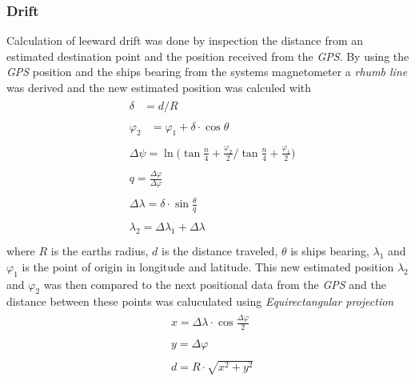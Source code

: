 \subsubsection{Drift}
Calculation of leeward drift was done by inspection the distance from an estimated destination point and the position received from the \textit{GPS}. By using the \textit{GPS} position and the ships bearing from the systems magnetometer a \textit{rhumb line}\cite{rhumb-line} was derived and the new estimated position was calculed with
\begin{align*}
  &\begin{aligned}
  \delta &= d/R 
  \end{aligned}\\
 &\begin{aligned}
  \varphi_2 &= \varphi_1 + \delta \cdot \cos{\theta}
  \end{aligned}\\
 &\begin{aligned}
  \Delta\psi = \ln { \bigg( \tan{\frac{n}{4} + \frac{\varphi_2}{2}} \bigg/ \tan{\frac{n}{4} + \frac{\varphi_1}{2}} \bigg)}
  \end{aligned}\\
 &\begin{aligned}
  q = \frac{\Delta\varphi}{\Delta\varphi}
  \end{aligned}\\
 &\begin{aligned}
  \Delta\lambda = \delta\cdot\sin\frac{\theta}{q}
  \end{aligned}\\
 &\begin{aligned}
  \lambda_2 = \Delta\lambda_1 + \Delta\lambda
  \end{aligned}\\
\end{align*}
where $R$ is the earths radius, $d$ is the distance traveled, $\theta$ is ships bearing, $\lambda_1$ and $\varphi_1$ is the point of origin in longitude and latitude. This new estimated position $\lambda_2$ and $\varphi_2$ was then compared to the next positional data from the \textit{GPS} and the distance between these points was caluculated using \textit{Equirectangular projection}\cite{equirectangular}
\begin{align*}
  &\begin{aligned}
  x = \Delta\lambda \cdot \cos\frac{\Delta\varphi}{2}
  \end{aligned}\\
 &\begin{aligned}
  y = \Delta\varphi
  \end{aligned}\\
 &\begin{aligned}
  d = R\cdot\sqrt{x^2+y^2}
  \end{aligned}\\
\end{align*}
